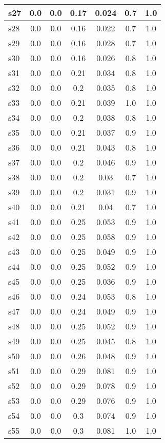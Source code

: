 \documentclass{article}
\begin{document}
\begin{tabular}{|l|c|c|c|c|c|c|}
\hline
s27 &0.0 & 0.0 & 0.17 & 0.024 & 0.7 & 1.0\\
\hline
s28 &0.0 & 0.0 & 0.16 & 0.022 & 0.7 & 1.0\\
\hline
s29 &0.0 & 0.0 & 0.16 & 0.028 & 0.7 & 1.0\\
\hline
s30 &0.0 & 0.0 & 0.16 & 0.026 & 0.8 & 1.0\\
\hline
s31 &0.0 & 0.0 & 0.21 & 0.034 & 0.8 & 1.0\\
\hline
s32 &0.0 & 0.0 & 0.2 & 0.035 & 0.8 & 1.0\\
\hline
s33 &0.0 & 0.0 & 0.21 & 0.039 & 1.0 & 1.0\\
\hline
s34 &0.0 & 0.0 & 0.2 & 0.038 & 0.8 & 1.0\\
\hline
s35 &0.0 & 0.0 & 0.21 & 0.037 & 0.9 & 1.0\\
\hline
s36 &0.0 & 0.0 & 0.21 & 0.043 & 0.8 & 1.0\\
\hline
s37 &0.0 & 0.0 & 0.2 & 0.046 & 0.9 & 1.0\\
\hline
s38 &0.0 & 0.0 & 0.2 & 0.03 & 0.7 & 1.0\\
\hline
s39 &0.0 & 0.0 & 0.2 & 0.031 & 0.9 & 1.0\\
\hline
s40 &0.0 & 0.0 & 0.21 & 0.04 & 0.7 & 1.0\\
\hline
s41 &0.0 & 0.0 & 0.25 & 0.053 & 0.9 & 1.0\\
\hline
s42 &0.0 & 0.0 & 0.25 & 0.058 & 0.9 & 1.0\\
\hline
s43 &0.0 & 0.0 & 0.25 & 0.049 & 0.9 & 1.0\\
\hline
s44 &0.0 & 0.0 & 0.25 & 0.052 & 0.9 & 1.0\\
\hline
s45 &0.0 & 0.0 & 0.25 & 0.036 & 0.9 & 1.0\\
\hline
s46 &0.0 & 0.0 & 0.24 & 0.053 & 0.8 & 1.0\\
\hline
s47 &0.0 & 0.0 & 0.24 & 0.049 & 0.9 & 1.0\\
\hline
s48 &0.0 & 0.0 & 0.25 & 0.052 & 0.9 & 1.0\\
\hline
s49 &0.0 & 0.0 & 0.25 & 0.045 & 0.8 & 1.0\\
\hline
s50 &0.0 & 0.0 & 0.26 & 0.048 & 0.9 & 1.0\\
\hline
s51 &0.0 & 0.0 & 0.29 & 0.081 & 0.9 & 1.0\\
\hline
s52 &0.0 & 0.0 & 0.29 & 0.078 & 0.9 & 1.0\\
\hline
s53 &0.0 & 0.0 & 0.29 & 0.076 & 0.9 & 1.0\\
\hline
s54 &0.0 & 0.0 & 0.3 & 0.074 & 0.9 & 1.0\\
\hline
s55 &0.0 & 0.0 & 0.3 & 0.081 & 1.0 & 1.0\\

\end{tabular}
\end{document}
